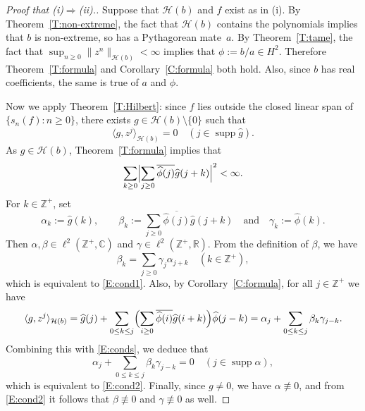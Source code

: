 \documentclass[11pt,reqno]{amsart}
\theoremstyle{plain}
\theoremstyle{definition}
\theoremstyle{remark}
\newcommand{\cH}{\mathcal{H}}
\newcommand{\CC}{\mathbb{C}}
\newcommand{\RR}{\mathbb{R}}
\newcommand{\ZZ}{\mathbb{Z}}
\renewcommand{\hat}{\widehat}
\DeclareMathOperator{\supp}{supp}
\begin{document}
\begin{proof}[Proof that (i)$\Rightarrow$(ii).]\let\qed\relax
Suppose that $\cH(b)$ and $f$ exist as in (i). 
By  Theorem~\ref{T:non-extreme},
the fact that $\cH(b)$ contains the polynomials implies that $b$ is non-extreme, 
so has a Pythagorean mate~$a$.
By Theorem~\ref{T:tame}, the fact that
$\sup_{n\ge0}\|z^n\|_{\cH(b)}<\infty$ implies that $\phi:=b/a\in H^2$. 
Therefore Theorem~\ref{T:formula} and Corollary~\ref{C:formula} both hold. Also, since $b$ has real coefficients, the same is
true of $a$ and $\phi$.

Now we apply Theorem~\ref{T:Hilbert}:
since $f$ lies outside the closed linear span
of $\{s_n(f):n\ge0\}$,    there exists $g\in\cH(b)\setminus\{0\}$  such that 
\begin{equation}\label{E:conds}
\langle g,z^j\rangle_{\cH(b)}=0 \quad(j\in \supp\hat{g}).
\end{equation}
As $g\in\cH(b)$, Theorem~\ref{T:formula} implies that 
\[
\sum_{k\ge0}\Bigl|\sum_{j\ge0}\overline{\hat{\phi}(j)}\hat{g}(j+k)\Bigr|^2<\infty.
\]
For $k\in\ZZ^+$, set
\[
\alpha_k:=\hat{g}(k), 
\qquad
\beta_k:=\sum_{j\ge0}\overline{\hat{\phi}(j)}\hat{g}(j+k)
\quad\text{and}\quad
\gamma_k:=\hat{\phi}(k).
\]
Then $\alpha,\beta\in\ell^2(\ZZ^+,\CC)$ and $\gamma\in\ell^2(\ZZ^+,\RR)$. From the definition of $\beta$, we have
\[
\beta_k=\sum_{j\ge0}\gamma_j\alpha_{j+k} \quad(k\in\ZZ^+),
\] 
which is equivalent to \eqref{E:cond1}. Also,  by Corollary~\ref{C:formula}, for all $j\in\ZZ^+$ we have
\[
\langle g,z^j\rangle_{\cH(b)}=\hat{g}(j)+\sum_{0\le k\le j}\Bigl(\sum_{i\ge0}\overline{\hat{\phi}(i)}\hat{g}(i+k)\Bigr)\hat{\phi}(j-k)=\alpha_j+\sum_{0\le k\le j}\beta_k\gamma_{j-k}.
\]
Combining this with \eqref{E:conds}, we deduce that
\[
\alpha_j+\sum_{0\le k\le j}\beta_k\gamma_{j-k}=0 \quad(j\in\supp\alpha),
\]
which is equivalent to \eqref{E:cond2}.
Finally, since $g\ne0$, we have $\alpha\not\equiv0$, and from \eqref{E:cond2} it follows that
$\beta\not\equiv0$ and $\gamma\not\equiv0$ as well.
\end{proof}
\end{document}
